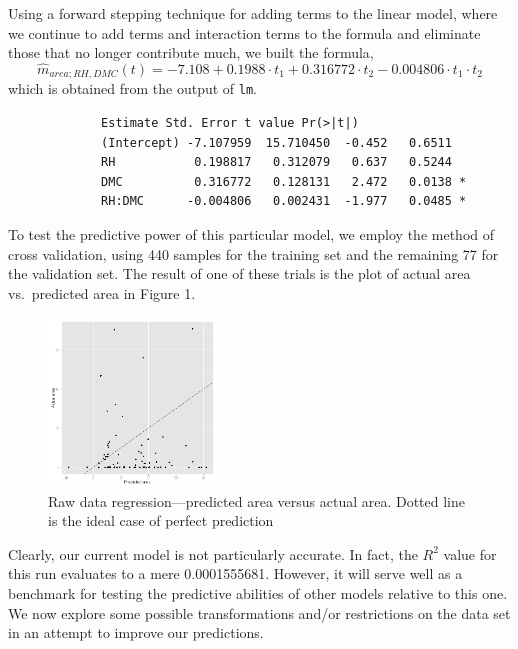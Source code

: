 \documentclass{article}
\begin{document}
Using a forward stepping technique for adding terms to the linear model, where
we continue to add terms and interaction terms to the formula and eliminate
those that no longer contribute much, we built the formula,
\begin{equation}
  \widehat{m}_{area;RH,DMC}(t) = -7.108 + 0.1988 \cdot t_1 + 0.316772 \cdot t_2
  - 0.004806 \cdot t_1 \cdot t_2
\end{equation}
which is obtained from the output of \verb=lm=.

\begin{verbatim}
             Estimate Std. Error t value Pr(>|t|)  
             (Intercept) -7.107959  15.710450  -0.452   0.6511  
             RH           0.198817   0.312079   0.637   0.5244  
             DMC          0.316772   0.128131   2.472   0.0138 *
             RH:DMC      -0.004806   0.002431  -1.977   0.0485 *
\end{verbatim}

To test the predictive power of this particular model, we employ the method of
cross validation, using 440 samples for the training set and the remaining 77
for the validation set. The result of one of these trials is the plot of actual
area vs.\ predicted area in Figure 1.

\begin{figure}[htb]
  \centering
  \includegraphics[width=0.4\textwidth]{figures/firenaivepredict.png}
  \caption{Raw data regression---predicted area versus actual area. Dotted line
  is the ideal case of perfect prediction}
\end{figure}

Clearly, our current model is not particularly accurate. In fact, the $R^2$
value for this run evaluates to a mere 0.0001555681. However, it will serve
well as a benchmark for testing the predictive abilities of other models
relative to this one. We now explore some possible transformations and/or
restrictions on the data set in an attempt to improve our predictions.
\end{document}
